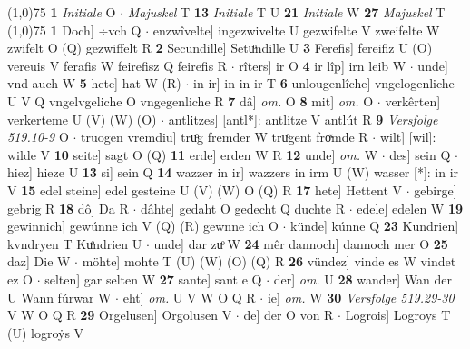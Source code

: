 \documentclass[8pt,a4paper,notitlepage]{article}
\begin{document}
\begin{table}[ht]
\begin{minipage}[t]{0.5\linewidth}
\line(1,0){75} \newline
\textbf{1} \textit{Initiale} O   $\cdot$ \textit{Majuskel} T  \textbf{13} \textit{Initiale} T U  \textbf{21} \textit{Initiale} W  \textbf{27} \textit{Majuskel} T  \newline
\line(1,0){75} \newline
\textbf{1} Doch] ÷vch Q  $\cdot$ enzwîvelte] ingezwivelte U gezwifelte V zweifelte W zwifelt O (Q) gezwiffelt R \textbf{2} Secundille] Setuͦndille U \textbf{3} Ferefis] fereifiz U (O) vereuis V ferafis W feirefisz Q feirefis R  $\cdot$ rîters] ir O \textbf{4} ir lîp] irn leib W  $\cdot$ unde] vnd auch W \textbf{5} hete] hat W (R)  $\cdot$ in ir] in in ir T \textbf{6} unlougenlîche] vngelogenliche U V Q vngelvgeliche O vngegenliche R \textbf{7} dâ] \textit{om.} O \textbf{8} mit] \textit{om.} O  $\cdot$ verkêrten] verkerteme U (V) (W) (O)  $\cdot$ antlitzes] [antl*]: antlitze V antlút R \textbf{9} \textit{Versfolge 519.10-9} O   $\cdot$ truogen vremdiu] truͦg fremder W truͦgent froͯmde R  $\cdot$ wilt] [wil]: wilde V \textbf{10} seite] sagt O (Q) \textbf{11} erde] erden W R \textbf{12} unde] \textit{om.} W  $\cdot$ des] sein Q  $\cdot$ hiez] hieze U \textbf{13} si] sein Q \textbf{14} wazzer in ir] wazzers in irm U (W) wasser [*]: in ir  V \textbf{15} edel steine] edel gesteine U (V) (W) O (Q) R \textbf{17} hete] Hettent V  $\cdot$ gebirge] gebrig R \textbf{18} dô] Da R  $\cdot$ dâhte] gedaht O gedecht Q duchte R  $\cdot$ edele] edelen W \textbf{19} gewinnich] gewúnne ich V (Q) (R) gewnne ich O  $\cdot$ künde] kúnne Q \textbf{23} Kundrien] kvndryen T Kuͦndrien U  $\cdot$ unde] dar zuͦ W \textbf{24} mêr dannoch] dannoch mer O \textbf{25} daz] Die W  $\cdot$ möhte] mohte T (U) (W) (O) (Q) R \textbf{26} vündez] vinde es W vindet ez O  $\cdot$ selten] gar selten W \textbf{27} sante] sant e Q  $\cdot$ der] \textit{om.} U \textbf{28} wander] Wan der U Wann fúrwar W  $\cdot$ eht] \textit{om.} U V W O Q R  $\cdot$ ie] \textit{om.} W \textbf{30} \textit{Versfolge 519.29-30} V W O Q R  \textbf{29} Orgelusen] Orgolusen V  $\cdot$ de] der O von R  $\cdot$ Logrois] Logroys T (U) logroẏs V \newline
\end{minipage}
\end{table}
\end{document}
